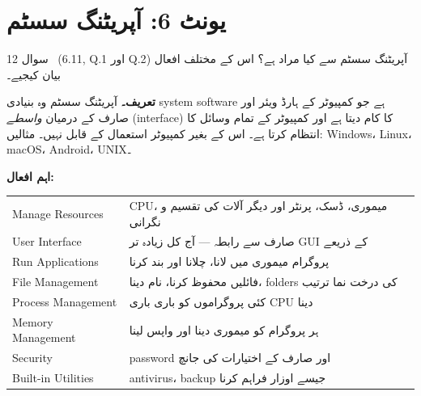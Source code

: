 \section*{یونٹ \textenglish{6}: آپریٹنگ سسٹم}

\begin{sawal}{سوال \textenglish{12} \ \textnormal{\small(\textenglish{6.11, Q.1} اور \textenglish{Q.2})}}
آپریٹنگ سسٹم سے کیا مراد ہے؟ اس کے مختلف افعال بیان کیجیے۔
\end{sawal}

\begin{hal}
\textbf{تعریف۔} آپریٹنگ سسٹم وہ بنیادی \textenglish{system software} ہے جو
کمپیوٹر کے ہارڈ ویئر اور صارف کے درمیان \emph{واسطے} (\textenglish{interface})
کا کام دیتا ہے اور کمپیوٹر کے تمام وسائل کا انتظام کرتا ہے۔ اس کے بغیر کمپیوٹر
استعمال کے قابل نہیں۔ مثالیں: \textenglish{Windows}، \textenglish{Linux}،
\textenglish{macOS}، \textenglish{Android}، \textenglish{UNIX}۔

\medskip
\textbf{اہم افعال:}
\begin{center}
\begin{tabular}{@{}p{4.4cm} p{9.8cm}@{}}
\toprule
\textenglish{Manage Resources} & \textenglish{CPU}، میموری، ڈسک، پرنٹر اور دیگر آلات کی تقسیم و نگرانی \\
\textenglish{User Interface} & صارف سے رابطہ --- آج کل زیادہ تر \textenglish{GUI} کے ذریعے \\
\textenglish{Run Applications} & پروگرام میموری میں لانا، چلانا اور بند کرنا \\
\textenglish{File Management} & فائلیں محفوظ کرنا، نام دینا، \textenglish{folders} کی درخت نما ترتیب \\
\textenglish{Process Management} & کئی پروگراموں کو باری باری \textenglish{CPU} دینا \\
\textenglish{Memory Management} & ہر پروگرام کو میموری دینا اور واپس لینا \\
\textenglish{Security} & \textenglish{password} اور صارف کے اختیارات کی جانچ \\
\textenglish{Built-in Utilities} & \textenglish{antivirus}، \textenglish{backup} جیسے اوزار فراہم کرنا \\
\bottomrule
\end{tabular}
\end{center}

\end{hal}

